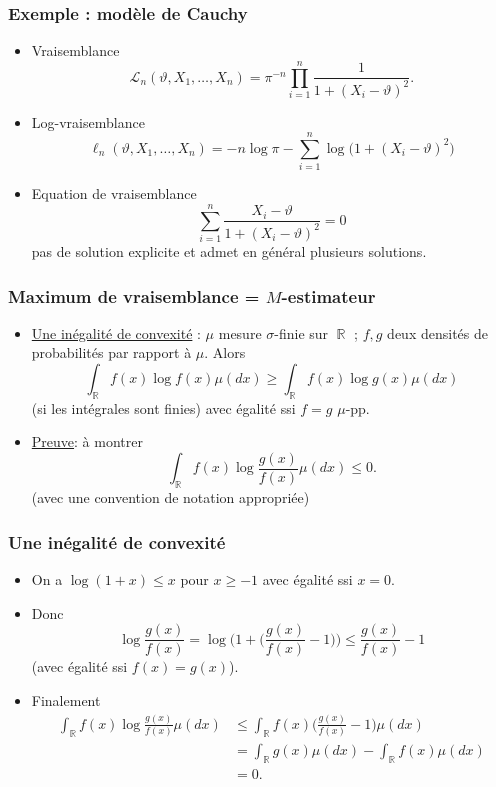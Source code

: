 ﻿\documentclass{beamer}
\DeclareMathOperator{\R}{{\mathbb R}}
\begin{document}
\begin{frame}
\frametitle{Exemple : mod\`ele de Cauchy}
\begin{itemize}
\item {\color{red}Vraisemblance}
$${\mathcal L}_n(\vartheta, X_1,\ldots, X_n) = \pi^{-n} \prod_{i =1}^n \frac{1}{1+(X_i-\vartheta)^2}.$$
\item {\color{red}Log-vraisemblance}
$$\ell_n(\vartheta,X_1,\ldots, X_n) = -n\log \pi -\sum_{i = 1}^n \log\big(1+(X_i-\vartheta)^2\big)$$
\item {\color{red}Equation de vraisemblance}
$$\boxed{\sum_{i = 1}^n \frac{X_i-\vartheta}{1+(X_i-\vartheta)^2}=0}$$
pas de solution explicite et admet en général plusieurs solutions.
\end{itemize}
\end{frame}


\begin{frame}
\frametitle{Maximum de vraisemblance = $M$-estimateur}
\begin{itemize}
\item \underline{Une inégalité de convexité} : $\mu$ mesure $\sigma$-finie sur $\R$ ; $f,g$ deux {\color{red}densités de probabilités} par rapport à $\mu$. Alors
$$\boxed{\int_{\R}f(x)\log f(x) \mu(dx) \geq \int_{\R} f(x) \log g(x) \mu(dx)}$$
(si les intégrales sont finies) avec égalité {\color{red}ssi} $f=g$ $\mu$-pp.
\item \underline{Preuve}: à montrer
$$\int_{\R} f(x) \log \frac{g(x)}{f(x)}\mu(dx) \leq 0.$$
(avec une convention de notation appropriée)
\end{itemize}
\end{frame}

\begin{frame}
\frametitle{Une inégalité de convexité}
\begin{itemize}
\item On a $\log(1+x)\leq x$ pour $x \geq -1$ avec égalité ssi $x=0$.
\item Donc
$$\log \frac{g(x)}{f(x)} = \log\Big(1+\big(\frac{g(x)}{f(x)}-1\big)\Big) \leq \frac{g(x)}{f(x)}-1$$
(avec égalité ssi $f(x)=g(x)$).
\item Finalement
\begin{align*}
\int_{\R}f(x)\log \frac{g(x)}{f(x)}\mu(dx)& \leq \int_{\R} f(x)\Big(\frac{g(x)}{f(x)}-1\Big)\mu(dx) \\
& = \int_{\R} g(x)\mu(dx)- \int_{\R}f(x) \mu(dx)\\
&=0.
\end{align*}
\end{itemize}
\end{frame}
\end{document}
